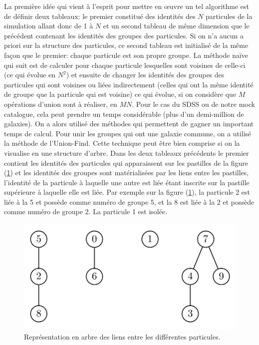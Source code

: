 La première idée qui vient à l'esprit pour mettre en {\oe}uvre un tel algorithme est de définir deux tableaux: le premier constitué
des identités des $N$ particules de la simulation allant donc de 1 à $N$ et un second tableau de même dimension que le précédent
contenant les identités des groupes des particules. Si on n'a aucun a priori sur la structure des particules, ce second tableau est
initialisé de la même façon que le premier: chaque particule est son propre groupe. La méthode naïve qui suit est de calculer pour
chaque particule lesquelles sont voisines de celle-ci (ce qui évolue en $N^2$) et ensuite de changer les identités des groupes des
particules qui sont voisines ou liées indirectement (celles qui ont la même identité de groupe que la particule qui est voisine) ce
qui évolue, si on considère que $M$ opérations d'union sont à réaliser, en $MN$. Pour le cas du SDSS ou de notre mock catalogue,
cela peut prendre un temps considérable (plus d'un demi-million de galaxies). On a alors utilisé des méthodes qui permettent de
gagner un important temps de calcul. Pour unir les groupes qui ont une galaxie commune, on a utilisé la méthode de l'Union-Find.
Cette technique peut être bien comprise si on la visualise en une structure d'arbre. Dans les deux tableaux précédents le premier
contient les identités des particules qui apparaissent sur les pastilles de la figure (\ref{fig:arbre1}) et les identités des
groupes sont matérialisées par les liens entre les pastilles, l'identité de la particule à laquelle une autre est liée étant
inscrite sur la pastille supérieure à laquelle elle est liée. Par exemple sur la figure (\ref{fig:arbre1}), la particule 2 est liée
à la 5 et possède comme numéro de groupe 5, et la 8 est liée à la 2 et possède comme numéro de groupe 2. La particule 1 est isolée.
\begin{figure}[htb]
	\centering
	\includegraphics[width=0.5\linewidth]{arbre1.png}
	\caption{\footnotesize{}Représentation en arbre des liens entre les différentes particules.}
	\label{fig:arbre1}
\end{figure}

